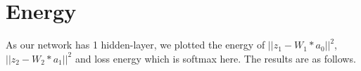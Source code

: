 \documentclass{article}
\begin{document}
\section{Energy}
As our network has 1 hidden-layer, we plotted the energy of $||z_1 - W_1*a_0||^2$, $||z_2 - W_2*a_1||^2$ and loss energy which is softmax here. The results are as follows.

\begin{figure}[htbp]
\centering
{}

\end{figure}
\end{document}
